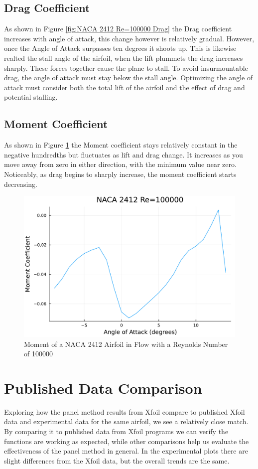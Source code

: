 \documentclass{article}
\begin{document}
\subsection{Drag Coefficient}
As shown in Figure \ref{fig:NACA 2412 Re=100000 Drag} the Drag coefficient increases with angle of attack, this change however is relatively gradual. However, once the Angle of Attack surpasses ten degrees it shoots up. This is likewise realted the stall angle of the airfoil, when the lift plummets the drag increases sharply. These forces together cause the plane to stall. To avoid insurmountable drag, the angle of attack must stay below the stall angle. Optimizing the angle of attack must consider both the total lift of the airfoil and the effect of drag and potential stalling.


\subsection{Moment Coefficient}
As shown in Figure \ref{fig:NACA 2412 Re=100000 Moment} the Moment coefficient stays relatively constant in the negative hundredths but fluctuates as lift and drag change. It increases as you move away from zero in either direction, with the minimum value near zero. Noticeably, as drag begins to sharply increase, the moment coefficient starts decreasing.

\begin{figure}[h]
\centering
\includegraphics[width=.55\linewidth]{NACA 2412 Re=100000_Moment_Coefficent_Plot.pdf}
\caption{\label{fig:NACA 2412 Re=100000 Moment}Moment of a NACA 2412 Airfoil in Flow with a Reynolds Number of 100000}
\end{figure}

\section{Published Data Comparison}
Exploring how the panel method results from Xfoil compare  to published Xfoil data and experimental data for the same airfoil, we see a relatively close match. By comparing it to published data from Xfoil programs we can verify the functions are working as expected, while other comparisons help us evaluate the effectiveness of the panel method in general. In the experimental plots there are slight differences from the Xfoil data, but the overall trends are the same.
\end{document}
